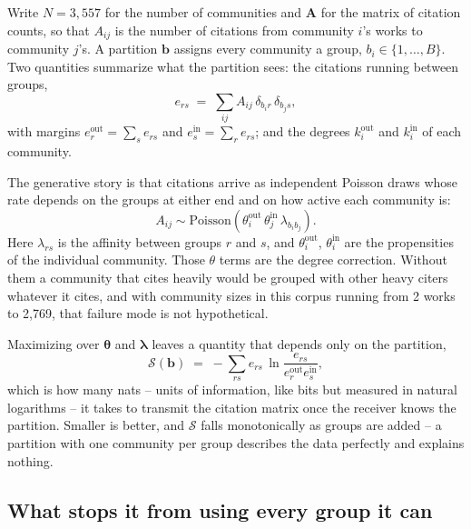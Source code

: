 \documentclass[11pt]{article}
\begin{document}
Write $N = 3{,}557$ for the number of communities and $\bm{A}$ for the matrix of
citation counts, so that $A_{ij}$ is the number of citations from community
$i$'s works to community $j$'s. A partition $\bm{b}$ assigns every community a
group, $b_i \in \{1, \dots, B\}$. Two quantities summarize what the partition
sees: the citations running between groups,
\[
e_{rs} \;=\; \sum_{ij} A_{ij}\,\delta_{b_i r}\,\delta_{b_j s},
\]
with margins $e^{\text{out}}_{r} = \sum_s e_{rs}$ and $e^{\text{in}}_{s} =
\sum_r e_{rs}$; and the degrees $k^{\text{out}}_{i}$ and $k^{\text{in}}_{i}$ of
each community.

The generative story is that citations arrive as independent Poisson draws
whose rate depends on the groups at either end and on how active each community
is:
\begin{equation}
A_{ij} \sim \mathrm{Poisson}\!\left(
  \theta^{\text{out}}_{i}\,\theta^{\text{in}}_{j}\,\lambda_{b_i b_j}\right).
\end{equation}
Here $\lambda_{rs}$ is the affinity between groups $r$ and $s$, and
$\theta^{\text{out}}_{i}$, $\theta^{\text{in}}_{i}$ are the propensities of the
individual community. Those $\theta$ terms are the degree correction. Without
them a community that cites heavily would be grouped with other heavy citers
whatever it cites, and with community sizes in this corpus running from 2 works
to 2{,}769, that failure mode is not hypothetical.

Maximizing over $\bm{\theta}$ and $\bm{\lambda}$ leaves a quantity that depends
only on the partition,
\begin{equation}
\mathcal{S}(\bm{b}) \;=\; -\sum_{rs} e_{rs}\,
  \ln\!\frac{e_{rs}}{e^{\text{out}}_{r} e^{\text{in}}_{s}},
\label{eq:entropy}
\end{equation}
which is how many nats -- units of information, like bits but measured in
natural logarithms -- it takes to transmit the citation matrix once the
receiver knows the partition. Smaller is better, and $\mathcal{S}$ falls
monotonically as groups are added -- a partition with one community per group
describes the data perfectly and explains nothing.

\subsection{What stops it from using every group it can}
\end{document}
